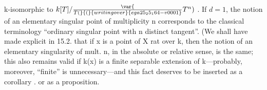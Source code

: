 
k-isomorphic to $k[T]/\var{\over{T}{(}}{(}{writing over}{ega25_25_164-v0001}T^n)$ . If $d=1$, the notion of an
 elementary singular point of multiplicity n corresponds to the classical
terminology ``ordinary singular point with n distinct tangent''.
(We shall  have made explicit in 15.2. that if x is a point of X rat over k, then
the notion of an elementary singularity of mult. n, in the absolute or
relative sense,  is the same; this also remains valid if k(x)
is a finite separable extension of k---probably, moreover, ``finite''
is unnecessary---and this fact deserves to be inserted as a corollary .
or as a proposition\hand{)}.

